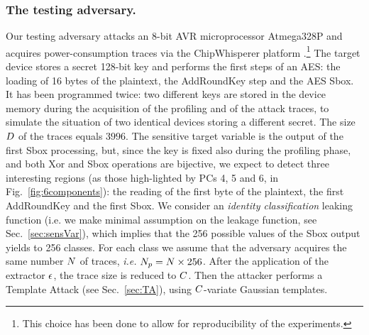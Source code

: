 \subsubsection{The testing adversary.}  
Our testing adversary attacks an 8-bit AVR microprocessor Atmega328P and acquires power-consumption traces via the ChipWhisperer platform \cite{o2014chipwhisperer}.\footnote{This choice has been done to allow for reproducibility of the experiments.} The target device stores a secret 128-bit key and performs the first steps of an AES: the loading of 16 bytes of the plaintext, the AddRoundKey step and the AES Sbox. It has been programmed twice: two different keys are stored in the device memory during the acquisition of the profiling and of the attack traces, to simulate the situation of two identical devices storing a different secret. The size $D$ of the traces equals $3996$. The sensitive target  variable is the output of the first Sbox processing, but, since the key is fixed also during the profiling phase, and both Xor and Sbox operations are bijective, we expect to detect three interesting regions (as those high-lighted by PCs 4, 5 and 6, in Fig.~\ref{fig:6components}): the reading of the first byte of the plaintext, the first AddRoundKey and the first Sbox. We consider an {\em identity classification} leaking function (i.e. we make minimal assumption on the leakage function, see Sec.~\ref{sec:sensVar}), which implies that the 256 possible values of the Sbox output yields to 256 classes. For each class we assume that the adversary acquires the same number $N$ of traces, \textit{i.e.} $N_p =N\times 256$. After the application of the extractor $\epsilon$, the trace size is reduced to $C$. Then the attacker performs a Template Attack (see Sec.~\ref{sec:TA}), using $C$-variate Gaussian templates.


